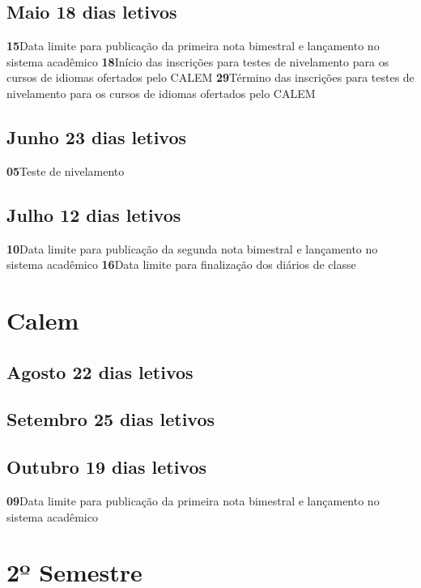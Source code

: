 \documentclass[thesis]{hmcposter}
\begin{document}
\begin{poster}
								\subsection{Maio \hfill 18 dias letivos}\textbf{15}\qquad Data limite para publicação da primeira nota bimestral e lançamento no sistema acadêmico \newline \null\textbf{18}\qquad Início das inscrições para testes de nivelamento para os cursos de
idiomas ofertados pelo CALEM \newline \null\textbf{29}\qquad Término das inscrições para testes de nivelamento para os cursos
de idiomas ofertados pelo CALEM \newline \null\subsection{Junho \hfill 23 dias letivos}\textbf{05}\qquad Teste de nivelamento \newline \null\subsection{Julho \hfill 12 dias letivos}\textbf{10}\qquad Data limite para publicação da segunda nota bimestral e lançamento no sistema acadêmico \newline \null\textbf{16}\qquad Data limite para finalização dos diários de classe \newline \null\newpage
\section{\color{hmcorange}Calem}\subsection{Agosto \hfill 22 dias letivos}\subsection{Setembro \hfill 25 dias letivos}\subsection{Outubro \hfill 19 dias letivos}\textbf{09}\qquad Data limite para publicação da primeira nota bimestral e lançamento no sistema acadêmico \newline \null\vfill\null
\columnbreak
\section{\hfill \color{hmcorange}2º Semestre}

\end{poster}
\end{document}
